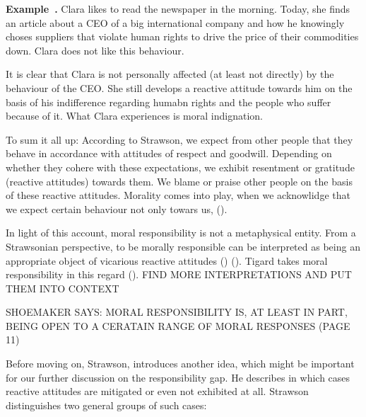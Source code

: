 \documentclass{article}
\newcounter{example}[section]
\newenvironment{example}[1][]{\refstepcounter{example}\par\medskip
   \noindent \textbf{Example~\theexample. #1} \rmfamily}{\medskip}
\begin{document}
\begin{example}
	Clara likes to read the newspaper in the morning. Today, she finds an
	article about a CEO of a big international company and how he knowingly
	choses suppliers that violate human rights to drive the price of their
	commodities down. Clara does not like this behaviour.
\end{example}


It is clear that Clara is not personally affected (at least not directly) by the
behaviour of the CEO. She still develops a reactive attitude towards him on the
basis of his indifference regarding humabn rights and the people who suffer
because of it. What Clara experiences is moral indignation.

To sum it all up: According to Strawson, we expect from other people that they
behave in accordance with attitudes of respect and goodwill. Depending on
whether they cohere with these expectations, we exhibit resentment or gratitude
(reactive attitudes) towards them. We blame or praise other people on the basis
of these reactive attitudes. Morality comes into play, when we acknowlidge that
we expect certain behaviour not only towars us,  (\cite[p.16]{Strawson1962}).

In light of this account, moral responsibility is not a metaphysical entity.
From a Strawsonian perspective, to be morally responsible can be interpreted as
being an appropriate object of vicarious reactive attitudes
(\cite[p.3]{SmithVickers2021}) (\cite[p.175]{Matthias_2004}). Tigard takes moral
responsibility in this regard  (\cite[p.3]{Tigard_2020}).  FIND MORE INTERPRETATIONS AND PUT THEM
INTO CONTEXT

SHOEMAKER SAYS: MORAL RESPONSIBILITY IS, AT LEAST IN PART, BEING OPEN TO A
CERATAIN RANGE OF MORAL RESPONSES (PAGE 11)


Before moving on, Strawson, introduces another idea, which might be important for
our further discussion on the responsibility gap. He describes in which cases
reactive attitudes are mitigated or even not exhibited at all. Strawson
distinguishes two general groups of such cases:
\end{document}
